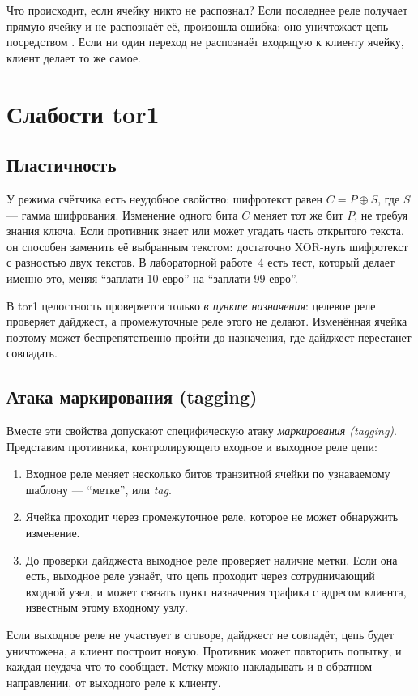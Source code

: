 Что происходит, если ячейку никто не распознал? Если последнее реле получает прямую ячейку и не распознаёт её, произошла ошибка: оно уничтожает цепь посредством . Если ни один переход не распознаёт входящую к клиенту ячейку, клиент делает то же самое.

\section{Слабости tor1}\label{sec:tor1-debolezze}

\subsection{Пластичность}

У режима счётчика есть неудобное свойство: шифротекст равен $C = P \oplus S$, где $S$ --- гамма шифрования. Изменение одного бита $C$ меняет тот же бит $P$, не требуя знания ключа. Если противник знает или может угадать часть открытого текста, он способен заменить её выбранным текстом: достаточно XOR-нуть шифротекст с разностью двух текстов. В лабораторной работе~4 есть тест, который делает именно это, меняя \enquote{заплати 10 евро} на \enquote{заплати 99 евро}.

В tor1 целостность проверяется только \emph{в пункте назначения}: целевое реле проверяет дайджест, а промежуточные реле этого не делают. Изменённая ячейка поэтому может беспрепятственно пройти до назначения, где дайджест перестанет совпадать.

\subsection{Атака маркирования (tagging)}

Вместе эти свойства допускают специфическую атаку \emph{маркирования (tagging)}. Представим противника, контролирующего входное и выходное реле цепи:
\begin{enumerate}
  \item Входное реле меняет несколько битов транзитной ячейки по узнаваемому шаблону --- \enquote{метке}, или \emph{tag}.
  \item Ячейка проходит через промежуточное реле, которое не может обнаружить изменение.
  \item До проверки дайджеста выходное реле проверяет наличие метки. Если она есть, выходное реле узнаёт, что цепь проходит через сотрудничающий входной узел, и может связать пункт назначения трафика с адресом клиента, известным этому входному узлу.
\end{enumerate}
Если выходное реле не участвует в сговоре, дайджест не совпадёт, цепь будет уничтожена, а клиент построит новую. Противник может повторить попытку, и каждая неудача что-то сообщает. Метку можно накладывать и в обратном направлении, от выходного реле к клиенту.

